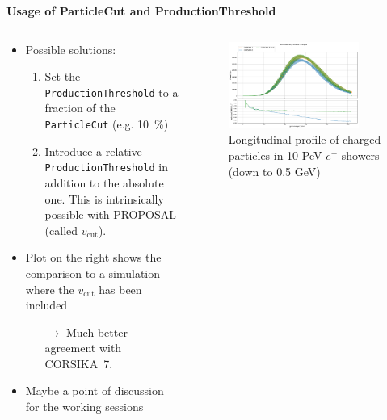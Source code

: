 \documentclass[aspectratio=1610, 9pt]{beamer}
\begin{document}
\begin{frame}

  \textbf{Usage of ParticleCut and ProductionThreshold}


    \begin{columns}[onlytextwidth]
        \begin{column}{0.45\textwidth}
            \begin{itemize}
              \item Possible solutions: 
              \begin{enumerate}
                \item Set the \texttt{ProductionThreshold} to a fraction of the \texttt{ParticleCut} (e.g. \SI{10}{\percent})
                \item Introduce a relative \texttt{ProductionThreshold} in addition to the absolute one. This is intrinsically possible with PROPOSAL (called $v_\text{cut}$).
              \end{enumerate}
              \item Plot on the right shows the comparison to a simulation where the $v_\text{cut}$ has been included
              \begin{itemize}
                \item[$\rightarrow$] Much better agreement with CORSIKA~7.
              \end{itemize}
              \item Maybe a point of discussion for the working sessions
            \end{itemize}
        \end{column}
        \begin{column}{0.55\textwidth}
            \begin{figure}
                \centering
                \includegraphics[width=0.85\textwidth]{plots/long_charged_vcut.png}
                \caption{Longitudinal profile of charged particles in 10 PeV $e^-$ showers (down to 0.5 GeV)}
            \end{figure}
        \end{column}
    \end{columns}
\end{frame}
\end{document}
